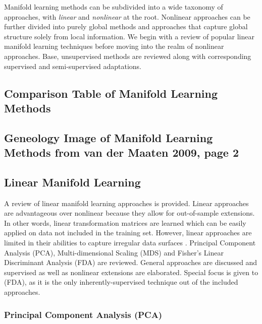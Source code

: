 Manifold learning methods can be subdivided into a wide taxonomy of approaches, with \textit{linear} and \textit{nonlinear} at the root. Nonlinear approaches can be further divided into purely global methods and approaches that capture global structure solely from local information.  We begin with a review of popular linear manifold learning techniques before moving into the realm of nonlinear approaches. Base, unsupervised methods are reviewed along with corresponding supervised and semi-supervised adaptations. 

\subsection{Comparison Table of Manifold Learning Methods}
\subsection{Geneology Image of Manifold Learning Methods from van der Maaten 2009, page  2}

\subsection{Linear Manifold Learning}
A review of linear manifold learning approaches is provided.  Linear approaches are advantageous over nonlinear because they allow for out-of-sample extensions.  In other words, linear transformation matrices are learned which can be easily applied on data not included in the training set.  However, linear approaches are limited in their abilities to capture irregular data surfaces \citep{Kegl2008PrincipalManifoldsTextbook}.  Principal Component Analysis (PCA), Multi-dimensional Scaling (MDS) and Fisher's Linear Discriminant Analysis (FDA) are reviewed.  General approaches are discussed and supervised as well as nonlinear extensions are elaborated. Special focus is given to (FDA), as it is the only inherently-supervised technique out of the included approaches.

\subsubsection{Principal Component Analysis (PCA)}

